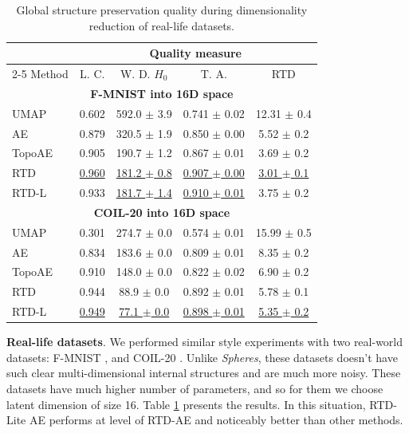 \documentclass[twoside]{article}
\begin{document}
\addtolength{\tabcolsep}{-2.5pt}
\begin{table}
\caption{Global structure preservation quality during dimensionality reduction of real-life datasets.}
\centering
\label{tbl:real16dim}
\begin{tabular}{lcccc}
    \toprule
    & \multicolumn{4}{c}{Quality measure}           \\
    \cmidrule(r){2-5}
    Method   & L. C. & W. D. $H_{0}$ &  T. A. & RTD \\
    \midrule
    \multicolumn{5}{c}{\textbf{F-MNIST into 16D space}} \\
    UMAP & 0.602 & 592.0 $\pm$ 3.9 & 0.741 $\pm$ 0.02 & 12.31 $\pm$ 0.4\\
    AE & 0.879 & 320.5 $\pm$ 1.9 & 0.850 $\pm$ 0.00 & 5.52 $\pm$ 0.2  \\
    TopoAE & 0.905 & 190.7 $\pm$ 1.2 & 0.867 $\pm$ 0.01 & 3.69 $\pm$ 0.2 \\
    RTD & \underline{0.960} &\underline {181.2 $\pm$ 0.8} & \underline{0.907 $\pm$ 0.00} & \underline{3.01 $\pm$ 0.1}\\
    RTD-L & {0.933} & \underline{181.7 $\pm$ 1.4} & \underline{0.910 $\pm$ 0.01} & {3.75 $\pm$ 0.2}\\
    \midrule
    \multicolumn{5}{c}{\textbf{COIL-20 into 16D space}} \\
   UMAP & 0.301 & 274.7 $\pm$ 0.0 &  0.574 $\pm$ 0.01 & 15.99 $\pm$ 0.5\\
    AE   & 0.834 & 183.6 $\pm$ 0.0 &  0.809 $\pm$ 0.01 & 8.35 $\pm$ 0.2\\
    TopoAE & 0.910 & 148.0 $\pm$ 0.0 & 0.822 $\pm$ 0.02 & 6.90 $\pm$ 0.2\\
    RTD & {0.944} & {88.9 $\pm$ 0.0} & {0.892 $\pm$ 0.01} & {5.78 $\pm$ 0.1}  \\
    RTD-L & \underline{0.949} & \underline{77.1 $\pm$ 0.0} & \underline{0.898 $\pm$ 0.01} & \underline{5.35 $\pm$ 0.2}\\
   \bottomrule
\end{tabular}
\end{table}
\addtolength{\tabcolsep}{2pt}
\vspace{-2mm}
\textbf{Real-life datasets}.
We performed similar style experiments with two real-world datasets: F-MNIST \citep{xiao2017online}, and COIL-20 \citep{nene1996columbia}. Unlike \textit{Spheres}, these datasets doesn't have such clear multi-dimensional internal structures and are much more noisy. These datasets have much higher number of parameters, and so for them we choose latent dimension of size 16. Table \ref{tbl:real16dim} presents the results. In this situation, RTD-Lite AE performs at level of \mbox{RTD-AE} and noticeably better than other methods.
\end{document}
